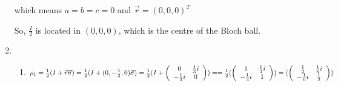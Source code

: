 \documentclass{article}
\begin{document}
\begin{enumerate}
          which means $a=b=c=0$ and $\vec{r}=(0,0,0)^T$

          So, $\frac{I}{2}$ is located in $(0,0,0)$, which is the centre of the Bloch ball.
    \item \begin{enumerate}
              \item $\rho_1
                        \\=\frac{1}{2}(I+\vec{r}\vec{\sigma})
                        \\=\frac{1}{2}(I+(0,-\frac{1}{3},0)\vec{\sigma})
                        \\=\frac{1}{2}(I+\left(
                        \begin{array}{cc}
                                0 & \frac{1}{3}i \\-\frac{1}{3}i&0\\
                            \end{array}
                        \right))
                        \\==\frac{1}{2}(\left(
                        \begin{array}{cc}
                                1 & \frac{1}{3}i \\-\frac{1}{3}i&1\\
                            \end{array}
                        \right))
                        \\=(\left(
                        \begin{array}{cc}
                                \frac{1}{2} & \frac{1}{6}i \\-\frac{1}{6}i&\frac{1}{2}\\
                            \end{array}
                        \right))
                    $


\end{enumerate}
\end{enumerate}
\end{document}
